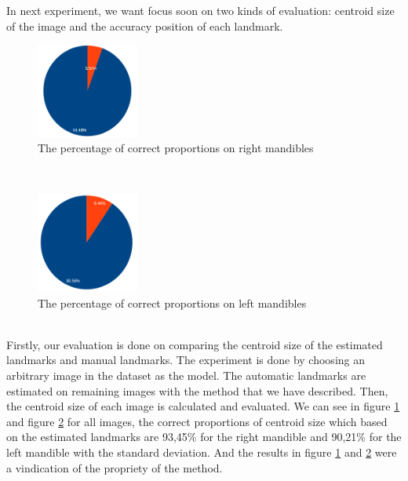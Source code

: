 \documentclass[twoside,twocolumn,10pt]{article}
\begin{document}
In next experiment, we want focus soon on two kinds of evaluation: centroid size of the image and the accuracy position of each landmark.
\begin{figure}[htb]
    \centering
    \includegraphics[width=0.3\textwidth]{./images/mdresult}
    \caption{The percentage of correct proportions on right mandibles }
    \label{figmdresult}
\end{figure}~\\
\begin{figure}[htb]
    \centering
    \includegraphics[width=0.3\textwidth]{./images/mgresult}
    \caption{The percentage of correct proportions on left mandibles }
    \label{figmgresult}
\end{figure}~\\
Firstly, our evaluation is done on comparing the centroid size of the estimated landmarks and manual landmarks. The experiment is done by choosing an arbitrary 
image in the dataset as the model. The automatic landmarks are estimated on remaining images with the method that we have described. Then, the centroid size of each image is calculated and evaluated. We can see in figure
\ref{figmdresult} and figure \ref{figmgresult} for all images, the
correct proportions of centroid size which based on the estimated landmarks are 93,45\% for the right
mandible and 90,21\% for the left mandible with the standard deviation\cite{bland1996statistics}. And the results in figure \ref{figmdresult} and \ref{figmgresult} were a vindication of the propriety of the method.\\
\end{document}
